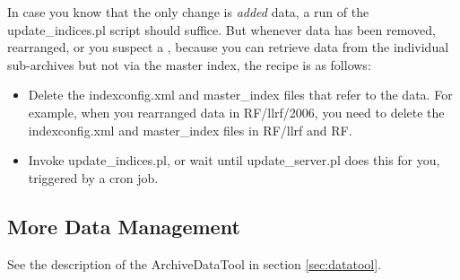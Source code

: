 In case you know that the only change is \emph{added} data, a run of the
update\_indices.pl script should suffice. But whenever data has been
removed, rearranged, or you suspect a ,
because you can retrieve data from the individual sub-archives but not
via the master index, the recipe is as follows:
\begin{itemize}
\item Delete the indexconfig.xml and master\_index files that refer to
      the data. For example, when you rearranged data in RF/llrf/2006,
      you need to delete the indexconfig.xml and master\_index files
      in RF/llrf and RF.
\item Invoke update\_indices.pl, or wait until update\_server.pl
      does this for you, triggered by a cron job.
\end{itemize}

\subsection{More Data Management}
See the description of the ArchiveDataTool in section \ref{sec:datatool}.
